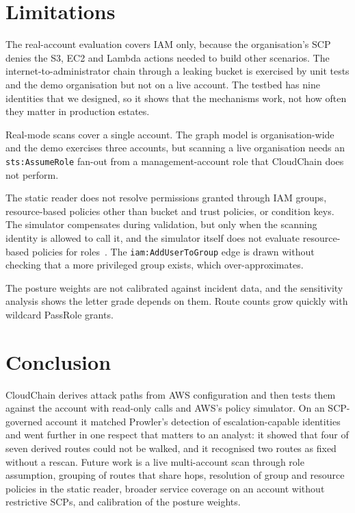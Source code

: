 \documentclass[conference]{IEEEtran}
\begin{document}
\section{Limitations}

The real-account evaluation covers IAM only, because the organisation's SCP denies the S3, EC2 and Lambda actions needed to build other scenarios. The internet-to-administrator chain through a leaking bucket is exercised by unit tests and the demo organisation but not on a live account. The testbed has nine identities that we designed, so it shows that the mechanisms work, not how often they matter in production estates.

Real-mode scans cover a single account. The graph model is organisation-wide and the demo exercises three accounts, but scanning a live organisation needs an \texttt{sts:AssumeRole} fan-out from a management-account role that CloudChain does not perform.

The static reader does not resolve permissions granted through IAM groups, resource-based policies other than bucket and trust policies, or condition keys. The simulator compensates during validation, but only when the scanning identity is allowed to call it, and the simulator itself does not evaluate resource-based policies for roles~\cite{awssim}. The \texttt{iam:AddUserToGroup} edge is drawn without checking that a more privileged group exists, which over-approximates.

The posture weights are not calibrated against incident data, and the sensitivity analysis shows the letter grade depends on them. Route counts grow quickly with wildcard PassRole grants.

\section{Conclusion}

CloudChain derives attack paths from AWS configuration and then tests them against the account with read-only calls and AWS's policy simulator. On an SCP-governed account it matched Prowler's detection of escalation-capable identities and went further in one respect that matters to an analyst: it showed that four of seven derived routes could not be walked, and it recognised two routes as fixed without a rescan. Future work is a live multi-account scan through role assumption, grouping of routes that share hops, resolution of group and resource policies in the static reader, broader service coverage on an account without restrictive SCPs, and calibration of the posture weights.
\end{document}
